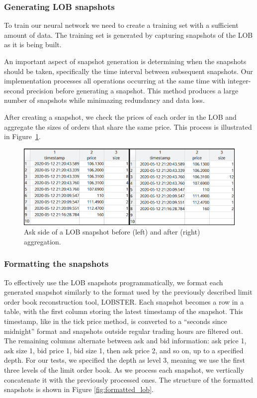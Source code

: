 \documentclass[a4paper,oneside,onecolumn,12pt]{book}
\begin{document}
		\subsubsection{Generating LOB snapshots}
			To train our neural network we need to create a training set with a sufficient amount of data. The training set is generated by capturing snapshots of the LOB as it is being built.

			An important aspect of snapshot generation is determining when the snapshots should be taken, specifically the time interval between subsequent snapshots. Our implementation processes all operations occurring at the same time with integer-second precision before generating a snapshot. This method produces a large number of snapshots while minimazing redundancy and data loss.

			After creating a snapshot, we check the prices of each order in the LOB and aggregate the sizes of orders that share the same price. This process is illustrated in Figure~\ref{fig:before_after_agg}.

			\begin{figure}[H]
			\begin{center}
				\includegraphics[width=\linewidth]{kep/lob_before_after_agg.png}
				\caption{Ask side of a LOB snapshot before (left) and after (right) aggregation.}
				\label{fig:before_after_agg}
			\end{center}
			\end{figure}

		\subsubsection{Formatting the snapshots}\label{section_FS}
			To effectively use the LOB snapshots programmatically, we format each generated snapshot similarly to the format used by the previously described limit order book reconstruction tool, LOBSTER. Each snapshot becomes a row in a table, with the first column storing the latest timestamp of the snapshot. This timestamp, like in the tick price method, is converted to a “seconds since midnight” format and snapshots outside regular trading hours are filtered out. The remaining columns alternate between ask and bid information: ask price 1, ask size 1, bid price 1, bid size 1, then ask price 2, and so on, up to a specified depth. For our tests, we specified the depth as level 3, meaning we use the first three levels of the limit order book. As we process each snapshot, we vertically concatenate it with the previously processed ones. The structure of the formatted snapshots is shown in Figure \ref{fig:formatted_lob}.
\end{document}
